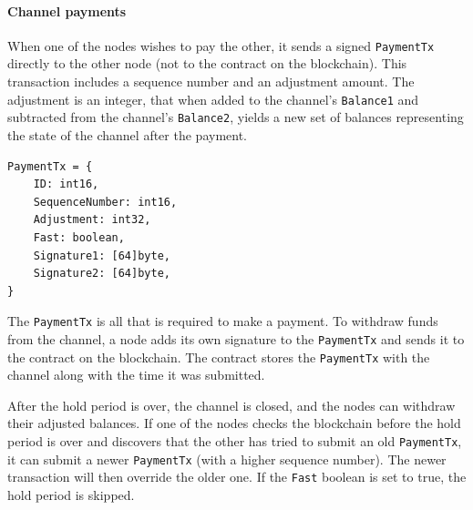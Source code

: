 \documentclass[11pt]{article}
\newlength{\currentparskip}
\newenvironment{unbreakable}
  {\setlength{\currentparskip}{\parskip}%
	 \vspace{\currentparskip}
   \begin{minipage}{\textwidth}%
   \setlength{\parskip}{\currentparskip}%
  }
  {\end{minipage}\vspace{\currentparskip}}
\begin{document}
\begin{unbreakable}
\paragraph{Channel payments}
When one of the nodes wishes to pay the other, it sends a signed \texttt{PaymentTx} directly to the other node (not to the contract on the blockchain). This transaction includes a sequence number and an adjustment amount. The adjustment is an integer, that when added to the channel’s \texttt{Balance1} and subtracted from the channel’s \texttt{Balance2}, yields a new set of balances representing the state of the channel after the payment.

\begin{lstlisting}
PaymentTx = {
	ID: int16,
	SequenceNumber: int16,
	Adjustment: int32,
	Fast: boolean,
	Signature1: [64]byte,
	Signature2: [64]byte,
}
\end{lstlisting}
\end{unbreakable}

The \texttt{PaymentTx} is all that is required to make a payment. To withdraw funds from the channel, a node adds its own signature to the \texttt{PaymentTx} and sends it to the contract on the blockchain. The contract stores the \texttt{PaymentTx} with the channel along with the time it was submitted.

After the hold period is over, the channel is closed, and the nodes can withdraw their adjusted balances. If one of the nodes checks the blockchain before the hold period is over and discovers that the other has tried to submit an old \texttt{PaymentTx}, it can submit a newer \texttt{PaymentTx} (with a higher sequence number). The newer transaction will then override the older one. If the \texttt{Fast} boolean is set to true, the hold period is skipped.
\end{document}
